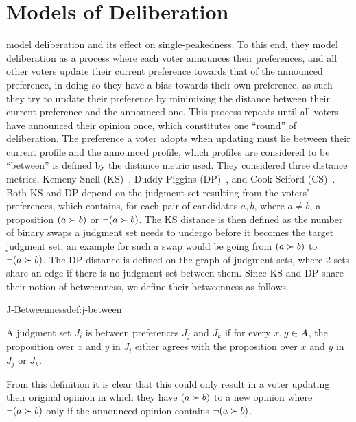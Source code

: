\section{Models of Deliberation} \label{section:related_work} %
\citet{radDeliberationSinglePeakednessCoherent2021} model deliberation
and its effect on single-peakedness. To this end, they model deliberation as
a process where each voter announces their preferences, and all other voters
update their current preference towards that of the announced preference, in
doing so they have a bias towards their own preference, as such they try to
update their preference by minimizing the distance between their current
preference and the announced one. This process repeats until all voters have
announced their opinion once, which constitutes one ``round'' of deliberation.
The preference a voter adopts when updating must lie between their current
profile and the announced profile, which profiles are considered to be
``between'' is defined by the distance metric used. They considered three
distance metrics, Kemeny-Snell (KS)~\citep{kemeny1962preference}, Duddy-Piggins
(DP)~\citep{duddyMeasureDistanceJudgment2012}, and Cook-Seiford
(CS)~\citep{cookPriorityRankingConsensus1978}. Both KS and DP depend on the
judgment set resulting from the voters' preferences, which contains, for
each pair of candidates $a,b$, where $a \neq b$, a proposition $(a \succ b)$ or
$\neg (a \succ b)$. The KS distance is then defined as the number of binary
swaps a judgment set needs to undergo before it becomes the target judgment
set, an example for such a swap would be going from $(a \succ b)$ to $\neg (a
	\succ b)$. The DP distance is defined on the graph of judgment sets, where 2
sets share an edge if there is no judgment set between them. Since KS and DP
share their notion of betweenness, we define their betweenness as follows.

\begin{definition}{J-Betweenness}{def:j-between}

	A judgment set $J_i$ is between preferences $J_j$ and $J_k$ if for
	every $x,y \in A$, the proposition over $x$ and $y$ in
	$J_i$ either agrees with the proposition over $x$ and $y$ in $J_j$ or $J_k$.

\end{definition}

From this definition it is clear that this could only result in a voter
updating their original opinion in which they have $(a \succ b)$ to a new
opinion where $\neg (a\succ b)$ only if the announced opinion contains $\neg (a
	\succ b)$.


